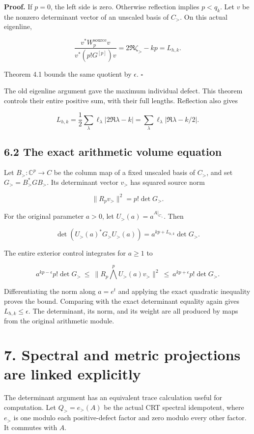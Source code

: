 \documentclass[
  11pt,
]{article}
\begin{document}
\textbf{Proof.} If \(p=0\), the left side is zero. Otherwise reflection
implies \(p<q_k\). Let \(v\) be the nonzero determinant vector of an
unscaled basis of \(C_{>}\). On this actual eigenline,

\[
\frac{v^*W_p^{\mathrm{source}}v}{v^*(p!G^{[p]})v}
=2\Re\zeta_{>}-kp=L_{h,k}.
\]

Theorem 4.1 bounds the same quotient by \(\epsilon\). \(\square\)

The old eigenline argument gave the maximum individual defect. This
theorem controls their entire positive sum, with their full lengths.
Reflection also gives

\[
L_{h,k}
=\frac12\sum_\lambda\ell_\lambda|2\Re\lambda-k|
=\sum_\lambda\ell_\lambda|\Re\lambda-k/2|.
\]

\subsection{6.2 The exact arithmetic volume
equation}\label{the-exact-arithmetic-volume-equation}

Let \(B_{>}:\mathbb C^p\to C\) be the column map of a fixed unscaled
basis of \(C_{>}\), and set \(G_{>}=B_{>}^*GB_{>}\). Its determinant
vector \(v_{>}\) has squared source norm

\[
\|R_pv_{>}\|^2=p!\det G_{>}.
\]

For the original parameter \(a>0\), let \(U_{>}(a)=a^{A|_{C_{>}}}\).
Then

\[
\boxed{
\det(U_{>}(a)^*G_{>}U_{>}(a))
=a^{kp+L_{h,k}}\det G_{>}.
}
\]

The entire exterior control integrates for \(a\geq1\) to

\[
a^{kp-\epsilon}p!\det G_{>}
\ \leq\ \|R_p\bigwedge^pU_{>}(a)v_{>}\|^2
\ \leq\ a^{kp+\epsilon}p!\det G_{>}.
\]

Differentiating the norm along \(a=e^t\) and applying the exact
quadratic inequality proves the bound. Comparing with the exact
determinant equality again gives \(L_{h,k}\leq\epsilon\). The
determinant, its norm, and its weight are all produced by maps from the
original arithmetic module.

\section{7. Spectral and metric projections are linked
explicitly}\label{spectral-and-metric-projections-are-linked-explicitly}

The determinant argument has an equivalent trace calculation useful for
computation. Let \(Q_{>}=e_{>}(A)\) be the actual CRT spectral
idempotent, where \(e_{>}\) is one modulo each positive-defect factor
and zero modulo every other factor. It commutes with \(A\).
\end{document}
